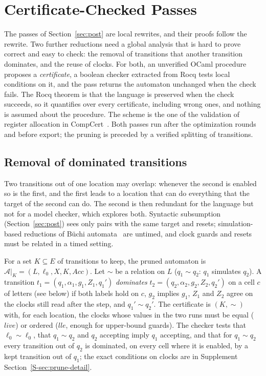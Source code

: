 \section{Certificate-Checked Passes}
\label{sec:checked}
The passes of Section~\ref{sec:post} are local rewrites, and their proofs follow the rewrite. Two further reductions need a global analysis that is hard to prove correct and easy to check: the removal of transitions that another transition dominates, and the reuse of clocks. For both, an unverified OCaml procedure proposes a \emph{certificate}, a boolean checker extracted from Rocq tests local conditions on it, and the pass returns the automaton unchanged when the check fails. The Rocq theorem is that the language is preserved when the check succeeds, so it quantifies over every certificate, including wrong ones, and nothing is assumed about the procedure. The scheme is the one of the validation of register allocation in CompCert~\cite{rideau_leroy_cc2010}. Both passes run after the optimization rounds and before export; the pruning is preceded by a verified splitting of transitions.

\subsection{Removal of dominated transitions}
\label{sec:prune}
Two transitions out of one location may overlap: whenever the second is enabled so is the first, and the first leads to a location that can do everything that the target of the second can do. The second is then redundant for the language but not for a model checker, which explores both. Syntactic subsumption (Section~\ref{sec:post}) sees only pairs with the same target and resets; simulation-based reductions of B\"uchi automata~\cite{clemente_mayr_lmcs19} are untimed, and clock guards and resets must be related in a timed setting.

For a set $K\subseteq E$ of transitions to keep, the pruned automaton is $\mathcal A|_K=(L,\ell_0,X,K,\mathit{Acc})$. Let $\sim$ be a relation on $L$ ($q_1\sim q_2$: $q_1$ simulates $q_2$). A transition $t_1=(q_1,\alpha_1,g_1,Z_1,q_1')$ \emph{dominates} $t_2=(q_2,\alpha_2,g_2,Z_2,q_2')$ on a cell $c$ of letters (see below) if both labels hold on $c$, $g_2$ implies $g_1$, $Z_1$ and $Z_2$ agree on the clocks still read after the step, and $q_1'\sim q_2'$. The certificate is $(K,\sim)$ with, for each location, the clocks whose values in the two runs must be equal ($\mathit{live}$) or ordered ($\mathit{lle}$, enough for upper-bound guards). The checker  tests that $\ell_0\sim\ell_0$, that $q_1\sim q_2$ and $q_2$ accepting imply $q_1$ accepting, and that for $q_1\sim q_2$ every transition out of $q_2$ is dominated, on every cell where it is enabled, by a kept transition out of $q_1$; the exact conditions on clocks are in Supplement Section~\ref{S-sec:prune-detail}.

